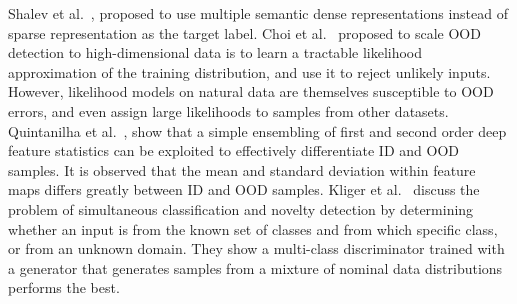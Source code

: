 \hspace*{3.5mm} Shalev et al.~\cite{OOD10}, proposed to use multiple semantic dense representations instead of sparse representation as the target label. Choi et al.~\cite{OOD11} proposed to scale OOD detection to high-dimensional data is to learn a tractable likelihood approximation of the training distribution, and use it to reject unlikely inputs. However, likelihood models on natural data are themselves susceptible to OOD errors, and even assign large likelihoods to samples from other datasets. Quintanilha  et al.~\cite{OOD12}, show that a simple ensembling of first and second order deep feature statistics can be exploited to effectively differentiate ID and OOD samples. It is observed that the mean and standard deviation within feature maps differs greatly between ID and OOD samples. Kliger et al.~\cite{OOD15} discuss the problem of simultaneous classification and novelty detection by determining whether an input is from the known set of classes and from which specific class, or from an unknown domain. They show a multi-class discriminator trained with a generator that generates samples from a mixture of nominal data distributions performs the best.

